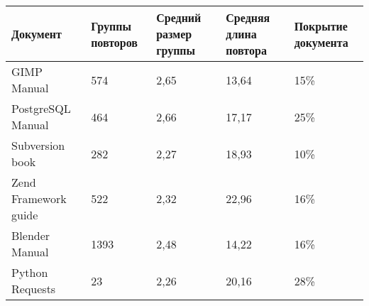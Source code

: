 \begin{minipage}{0.9\textwidth}
\begin{adjustbox}{center}
\begin{tabular}{|l||m{}|m{}|m{}|m{}|}
	\hline
	Документ & Группы повторов & Средний размер группы & Средняя длина повтора & Покрытие документа \\
	\hline
	\hline
	GIMP Manual & 574 & 2,65 & 13,64 & 15\% \\
	\hline
	PostgreSQL Manual & 464 & 2,66 & 17,17 & 25\% \\
	\hline
	Subversion book & 282 & 2,27 & 18,93 & 10\% \\
	\hline
	Zend Framework guide & 522 & 2,32 & 22,96 & 16\% \\
	\hline
	Blender Manual & 1393 & 2,48 & 14,22 & 16\% \\
	\hline
	Python Requests & 23 & 2,26 & 20,16 & 28\% \\
	\hline
\end{tabular}
\end{adjustbox}
\end{minipage}